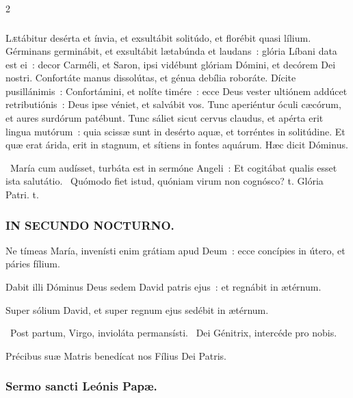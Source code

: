 \documentclass[9pt,twoside]{extarticle}
\begin{document}
\begin{multicols}{2}
\subsubsection*{}
\lettrine{L}ætábitur desérta et ínvia, et exsultábit solitúdo, et florébit quasi lílium.
Gérminans germinábit, et exsultábit lætabúnda et laudans~: glória Líbani data est ei~: decor Carméli, et Saron, ipsi vidébunt glóriam Dómini, et decórem Dei nostri.
Confortáte manus dissolútas, et génua debília roboráte.
Dícite pusillánimis~: Confortámini, et nolíte timére~: ecce Deus vester ultiónem addúcet retributiónis~: Deus ipse véniet, et salvábit vos.
Tunc aperiéntur óculi cæcórum, et aures surdórum patébunt.
Tunc sáliet sicut cervus claudus, et apérta erit lingua mutórum~: quia scissæ sunt in desérto aquæ, et torréntes in solitúdine.
Et quæ erat árida, erit in stagnum, et sítiens in fontes aquárum. Hæc dicit Dóminus.

\begin{tightlist}{}
\item {}~María cum audísset, turbáta est in sermóne Angeli~: \textred{*} Et cogitábat qualis esset ista salutátio. ~Quómodo fiet istud, quóniam virum non cognósco? t. Glória Patri. t.
\end{tightlist}

\subsubsection*{\center \textsc{IN SECUNDO NOCTURNO.}}
\begin{tightlist}{}
\item {} Ne tímeas María, invenísti enim grátiam apud Deum~: ecce concípies in útero, et páries fílium.
\item {} Dabit illi Dóminus Deus sedem David patris ejus~: et regnábit in ætérnum.
\item {} Super sólium David, et super regnum ejus sedébit in ætérnum.
\item {}~Post partum, Virgo, invioláta permansísti. ~Dei Génitrix, intercéde pro nobis.
\item {\small {} Précibus suæ Matris benedícat nos Fílius Dei Patris.}
\end{tightlist}

\subsubsection*{\center Sermo sancti Leónis Papæ.}

\end{multicols}
\end{document}
